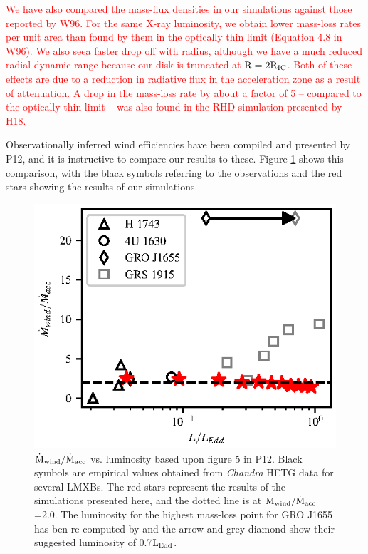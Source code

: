 \documentclass[a4paper,fleqn,usenatbib]{mnras}
\begin{document}
\textcolor{red}{We have also compared the mass-flux densities in our
simulations against those reported by W96. For the same X-ray
luminosity, we obtain lower mass-loss rates per unit area than found
by them in the optically thin limit (Equation 4.8 in W96). 
We also seea faster drop off with radius, although we have a much reduced radial
dynamic range because our disk is truncated at $\rm{R=2R_{IC}}$. 
Both of these effects are due to a reduction in radiative flux in the acceleration 
zone as a result of attenuation. A drop in the mass-loss rate by about
a factor of 5 -- compared to the optically thin limit -- was also
found in the RHD simulation presented by H18.}

Observationally inferred wind efficiencies have been compiled and
presented by P12, and it is instructive to
compare our results to these. Figure \ref{figure:mdot_vs_lum} shows 
this comparison, with the black symbols referring to the observations
and the red stars showing the results of our simulations. 

\begin{figure}
\includegraphics[width=\columnwidth]{figures/fig4_ponti.eps}
\caption{$\rm{\dot{M}_{wind}/\dot{M}_{acc}}$ vs. luminosity based upon figure 5 in P12. 
Black symbols are empirical values obtained from {\em Chandra} HETG data for several LMXBs. 
The red stars represent the results of the simulations presented here, and the dotted line
is at $\rm{\dot{M}_{wind}/\dot{M}_{acc}}$=2.0. The luminosity for the highest mass-loss
point for GRO J1655 has ben re-computed by  \protect\cite{2016ApJ...823..159S} and the
arrow and grey diamond show their suggested luminosity of 0.7$\rm{L_{Edd}}$.}
\label{figure:mdot_vs_lum}
\end{figure}
\end{document}
